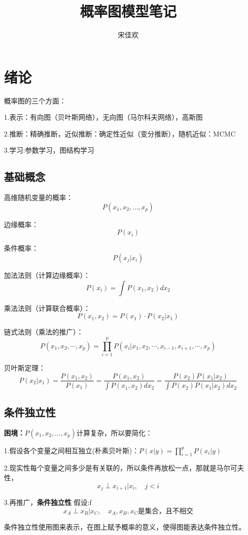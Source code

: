 \documentclass[UTF8]{ctexart} %
\title{概率图模型笔记}
\author{宋佳欢}
\begin{document}
	\maketitle
	\tableofcontents
	\songti {}
	
	
	\section{绪论}
		概率图的三个方面：
		
		1.表示：有向图（贝叶斯网络），无向图（马尔科夫网络），高斯图
		
		2.推断：精确推断，近似推断：确定性近似（变分推断），随机近似：MCMC
		
		3.学习:参数学习，图结构学习
		
		\subsection{基础概念}
			高维随机变量的概率：\[P(x_1,x_2,...,x_p)\]
			
			边缘概率：\[P(x_i)\]
			
			条件概率：\[P(x_j|x_i)\]
		
			加法法则（计算边缘概率）：\[P(x_i) = \int P(x_1,x_2)dx_2\]
			
			乘法法则（计算联合概率）：\[P(x_1,x_2) = P(x_1)\cdot P(x_2|x_1)\]
			
			链式法则（乘法的推广）：\[P(x_1,x_2,\cdots,x_p) = \prod_{i=1}^pP(x_i|x_1,x_2,\cdots,x_{i-1},x_{i+1},\cdots, x_p)\]
			
			贝叶斯定理：
			\[P(x_2|x_1)=\frac{P(x_1,x_2)}{P(x_1)} = \frac{P(x_1,x_2)}{\int P(x_1,x_2)dx_2} = \frac{P(x_2) P(x_1|x_2)}{\int P(x_2) P(x_1|x_2)dx_2}\]
			
		\subsection{条件独立性}	
			\textbf{困境：}$P(x_1,x_2,...,x_p)$计算复杂，所以要简化：
			
			1.假设各个变量之间相互独立(朴素贝叶斯)：$P(x|y) = \prod_{i=1}^pP(x_i|y)$
			
			2.现实性每个变量之间多少是有关联的，所以条件再放松一点，那就是马尔可夫性，\[x_j\perp x_{i+1}|x_i,\quad j<i\]
			                                                                         
			3.再推广，\textbf{条件独立性} 假设:f
			\[x_A\perp x_B|x_C,\quad x_A,x_B,x_C\text{是集合，且不相交}\]
			
			条件独立性使用图来表示，在图上赋予概率的意义，使得图能表达条件独立性。
	
\end{document}
